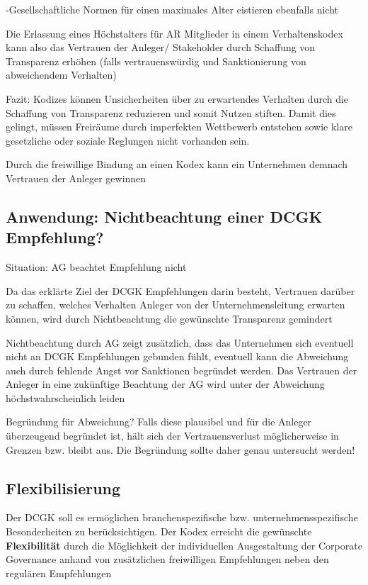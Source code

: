 \documentclass[
]{article}
\begin{document}
-Gesellschaftliche Normen für einen maximales Alter eistieren ebenfalls
nicht

Die Erlassung eines Höchstalters für AR Mitglieder in einem
Verhaltenskodex kann also das Vertrauen der Anleger/ Stakeholder durch
Schaffung von Transparenz erhöhen (falls vertrauenswürdig und
Sanktionierung von abweichendem Verhalten)

Fazit: Kodizes können Unsicherheiten über zu erwartendes Verhalten durch
die Schaffung von Transparenz reduzieren und somit Nutzen stiften. Damit
dies gelingt, müssen Freiräume durch imperfekten Wettbewerb entstehen
sowie klare gesetzliche oder soziale Reglungen nicht vorhanden sein.

Durch die freiwillige Bindung an einen Kodex kann ein Unternehmen
demnach Vertrauen der Anleger gewinnen

\hypertarget{anwendung-nichtbeachtung-einer-dcgk-empfehlung}{%
\subsection{Anwendung: Nichtbeachtung einer DCGK
Empfehlung?}\label{anwendung-nichtbeachtung-einer-dcgk-empfehlung}}

Situation: AG beachtet Empfehlung nicht

Da das erklärte Ziel der DCGK Empfehlungen darin besteht, Vertrauen
darüber zu schaffen, welches Verhalten Anleger von der
Unternehmensleitung erwarten können, wird durch Nichtbeachtung die
gewünschte Transparenz gemindert

Nichtbeachtung durch AG zeigt zusätzlich, dass das Unternehmen sich
eventuell nicht an DCGK Empfehlungen gebunden fühlt, eventuell kann die
Abweichung auch durch fehlende Angst vor Sanktionen begründet werden.
Das Vertrauen der Anleger in eine zukünftige Beachtung der AG wird unter
der Abweichung höchstwahrscheinlich leiden

Begründung für Abweichung? Falls diese plausibel und für die Anleger
überzeugend begründet ist, hält sich der Vertrauensverlust
möglicherweise in Grenzen bzw. bleibt aus. Die Begründung sollte daher
genau untersucht werden!

\hypertarget{flexibilisierung}{%
\subsection{Flexibilisierung}\label{flexibilisierung}}

Der DCGK soll es ermöglichen branchenspezifische bzw.
unternehmensspezifische Besonderheiten zu berücksichtigen. Der Kodex
erreicht die gewünschte \textbf{Flexibilität} durch die Möglichkeit der
individuellen Ausgestaltung der Corporate Governance anhand von
zusätzlichen freiwilligen Empfehlungen neben den regulären Empfehlungen
\end{document}
